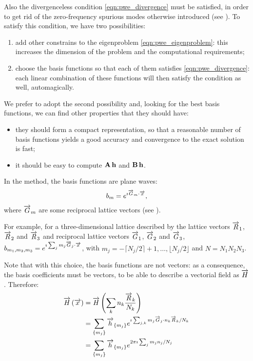 Also the divergenceless condition \eqref{eqn:pwe_divergence} must be
satisfied, in order to get rid of the zero-frequency spurious modes
otherwise introduced (see ). To satisfy this
condition, we have two possibilities:
\begin{enumerate}
\item
  add other constrains to the eigenproblem
  \eqref{eqn:pwe_eigenproblem}: this increases the dimension of the
  problem and the computational requirements;
\item
  choose the basis functions so that each of them satisfies
  \eqref{eqn:pwe_divergence}: each linear combination of these
  functions will then satisfy the condition as well, automagically.
\end{enumerate}

We prefer to adopt the second possibility and, looking for the best
basis functions, we can find other properties that they should have:
\begin{itemize}
\item
  they should form a compact representation, so that a reasonable
  number of basis functions yields a good accuracy and convergence to
  the exact solution is fast;
\item
  it should be easy to compute ${\mathbf{A}\,\mathbf{h}}$ and
  ${\mathbf{B}\,\mathbf{h}}$.
\end{itemize}

In the \PWE method, the basis functions are plane waves:
\begin{equation*}
  b_m = e^{\imath {\overrightarrow{G}_m \cdot \overrightarrow{x}}},
\end{equation*}
where $\overrightarrow{G}_m$ are some reciprocal lattice vectors (see
).

For example, for a three-dimensional lattice described by the lattice
vectors $\overrightarrow{R}_1$, $\overrightarrow{R}_2$ and $\overrightarrow{R}_3$ and
reciprocal lattice vectors $\overrightarrow{G}_1$, $\overrightarrow{G}_2$ and
$\overrightarrow{G}_3$, $b_{m_1,m_2,m_3} = e^{\imath \sum_j{m_j
{\overrightarrow{G}_j \cdot \overrightarrow{x}}}}$, with $m_j = -\lceil N_j/2
\rceil +1, \dotsc, \lfloor N_j/2 \rfloor$ and $N = N_1 N_2 N_3$.

Note that with this choice, the basis functions are not vectors: as a
consequence, the basis coefficients must be vectors, to be able to
describe a vectorial field as $\overrightarrow{H}$. Therefore:
\begin{equation} \label{eqn:pwe_expansion_pw} \begin{split}
\overrightarrow{H}\left(\overrightarrow{x}\right) & = \overrightarrow{H}\left( \sum_k n_k \frac{\overrightarrow{R}_k}{N_k}\right) \\
                          & = \sum_{\{m_j\}} \overrightarrow{h}_{\{m_j\}}e^{\imath \sum_{j,k} m_j {\overrightarrow{G}_j \cdot n_k \overrightarrow{R}_k/N_k}} \\
                          & = \sum_{\{m_j\}} \overrightarrow{h}_{\{m_j\}} e^{2 \pi \imath \sum_j m_j n_j / N_j}
\end{split} \end{equation}
  
